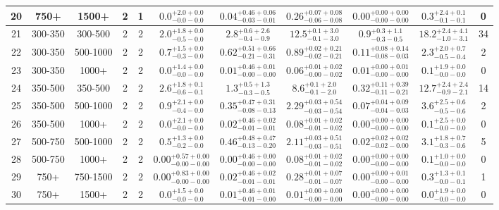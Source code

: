\documentclass[11pt, oneside]{article}
\begin{document}
\begin{table}
{\begin{tabular}{ |c|c|c|c|c||c|c|c|c||c|c| }
20 & 750+ & 1500+ & 2 & 1 & $0.0^{+2.0+0.0}_{-0.0-0.0}$ & $0.04^{+0.46+0.06}_{-0.03-0.01}$ & $0.26^{+0.07+0.08}_{-0.06-0.08}$ & $0.00^{+0.00+0.00}_{-0.00-0.00}$ & $0.3^{+2.4+0.1}_{-0.1-0.1}$ & 0 \\ \hline
21 & 300-350 & 300-500 & 2 & 2 & $2.0^{+1.8+0.0}_{-0.5-0.0}$ & $2.8^{+0.6+2.6}_{-0.4-0.9}$ & $12.5^{+0.1+3.0}_{-0.1-3.0}$ & $0.9^{+0.3+1.1}_{-0.3-0.5}$ & $18.2^{+2.4+4.1}_{-1.0-3.1}$ & 34 \\ \hline
22 & 300-350 & 500-1000 & 2 & 2 & $0.7^{+1.5+0.0}_{-0.3-0.0}$ & $0.62^{+0.51+0.66}_{-0.21-0.31}$ & $0.89^{+0.02+0.21}_{-0.02-0.21}$ & $0.11^{+0.08+0.14}_{-0.08-0.03}$ & $2.3^{+2.0+0.7}_{-0.5-0.4}$ & 2 \\ \hline
23 & 300-350 & 1000+ & 2 & 2 & $0.0^{+1.4+0.0}_{-0.0-0.0}$ & $0.01^{+0.46+0.01}_{-0.00-0.00}$ & $0.06^{+0.01+0.02}_{-0.00-0.02}$ & $0.01^{+0.00+0.01}_{-0.00-0.00}$ & $0.1^{+1.9+0.0}_{-0.0-0.0}$ & 0 \\ \hline
24 & 350-500 & 350-500 & 2 & 2 & $2.6^{+1.8+0.1}_{-0.6-0.1}$ & $1.3^{+0.5+1.3}_{-0.3-0.5}$ & $8.6^{+0.1+2.0}_{-0.1-2.0}$ & $0.32^{+0.11+0.39}_{-0.11-0.21}$ & $12.7^{+2.4+2.4}_{-0.9-2.1}$ & 14 \\ \hline
25 & 350-500 & 500-1000 & 2 & 2 & $0.9^{+2.1+0.0}_{-0.4-0.0}$ & $0.35^{+0.47+0.31}_{-0.08-0.13}$ & $2.29^{+0.03+0.54}_{-0.03-0.54}$ & $0.07^{+0.04+0.09}_{-0.04-0.03}$ & $3.6^{+2.5+0.6}_{-0.5-0.6}$ & 2 \\ \hline
26 & 350-500 & 1000+ & 2 & 2 & $0.0^{+2.1+0.0}_{-0.0-0.0}$ & $0.02^{+0.46+0.02}_{-0.01-0.01}$ & $0.08^{+0.01+0.02}_{-0.01-0.02}$ & $0.00^{+0.00+0.00}_{-0.00-0.00}$ & $0.1^{+2.5+0.0}_{-0.0-0.0}$ & 0 \\ \hline
27 & 500-750 & 500-1000 & 2 & 2 & $0.5^{+1.3+0.0}_{-0.2-0.0}$ & $0.46^{+0.48+0.47}_{-0.13-0.20}$ & $2.11^{+0.03+0.51}_{-0.03-0.51}$ & $0.02^{+0.02+0.02}_{-0.02-0.00}$ & $3.1^{+1.8+0.7}_{-0.3-0.6}$ & 5 \\ \hline
28 & 500-750 & 1000+ & 2 & 2 & $0.00^{+0.57+0.00}_{-0.00-0.00}$ & $0.00^{+0.46+0.00}_{-0.00-0.00}$ & $0.08^{+0.01+0.02}_{-0.01-0.02}$ & $0.00^{+0.00+0.00}_{-0.00-0.00}$ & $0.1^{+1.0+0.0}_{-0.0-0.0}$ & 0 \\ \hline
29 & 750+ & 750-1500 & 2 & 2 & $0.00^{+0.83+0.00}_{-0.00-0.00}$ & $0.02^{+0.46+0.02}_{-0.01-0.01}$ & $0.28^{+0.01+0.07}_{-0.01-0.07}$ & $0.00^{+0.00+0.01}_{-0.00-0.00}$ & $0.3^{+1.3+0.1}_{-0.0-0.1}$ & 1 \\ \hline
30 & 750+ & 1500+ & 2 & 2 & $0.0^{+1.5+0.0}_{-0.0-0.0}$ & $0.01^{+0.46+0.01}_{-0.01-0.00}$ & $0.01^{+0.00+0.00}_{-0.00-0.00}$ & $0.00^{+0.00+0.00}_{-0.00-0.00}$ & $0.0^{+1.9+0.0}_{-0.0-0.0}$ & 0 \\ \hline
\end{tabular}}
\end{table}
\end{document}
